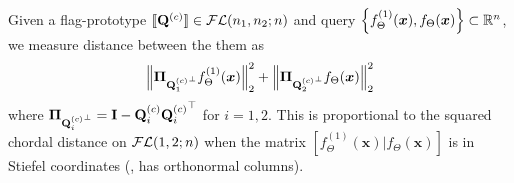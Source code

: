     Given a flag-prototype $[\![\mathbf{Q}^{(c)}]\!] \in \mathcal{FL}(n_1,n_2;n)$ and query $\left\{f^{(1)}_{\Theta}(\bm{x}), f_{\Theta}(\bm{x})\right\} \subset\mathbb{R}^n$, we measure distance between the them as
    \begin{equation}\label{eq: fewshot_dist}
        \left \| \boldsymbol{\Pi}_{{\mathbf{Q}^{(c)}_1}^\perp}f_{\Theta}^{(1)}(\bm{x}) \right \|_2^2 + \left \| \boldsymbol{\Pi}_{{\mathbf{Q}^{(c)}_2}^\perp}f_{\Theta}(\bm{x}) \right \|_2^2
    \end{equation}
    where $\boldsymbol{\Pi}_{{\mathbf{Q}^{(c)}_i}^\perp} = \mathbf{I} - \mathbf{Q}^{(c)}_i {\mathbf{Q}^{(c)}_i}^\top$ for $i=1,2$.
    This is proportional to the squared chordal distance on $\mathcal{FL}(1,2;n)$ when the matrix $\left[ f_{\Theta}^{(1)}(\bm{x})| f_{\Theta}(\bm{x}) \right]$ is in Stiefel coordinates (\eg, has orthonormal columns). 

